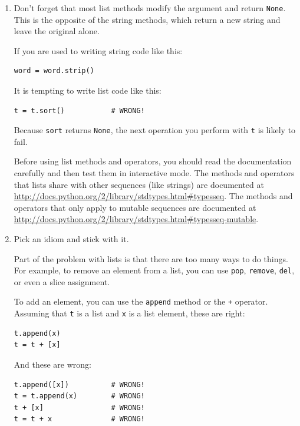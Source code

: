 \documentclass[10pt]{book}
\begin{document}
\begin{enumerate}

\item Don't forget that most list methods modify the argument and
  return {\tt None}.  This is the opposite of the string methods,
  which return a new string and leave the original alone.

If you are used to writing string code like this:

\begin{verbatim}
word = word.strip()
\end{verbatim}

It is tempting to write list code like this:

\begin{verbatim}
t = t.sort()           # WRONG!
\end{verbatim}

Because {\tt sort} returns {\tt None}, the
next operation you perform with {\tt t} is likely to fail.

Before using list methods and operators, you should read the
documentation carefully and then test them in interactive mode.  The
methods and operators that lists share with other sequences (like
strings) are documented at
\url{http://docs.python.org/2/library/stdtypes.html#typesseq}.  The
methods and operators that only apply to mutable sequences
are documented at \url{http://docs.python.org/2/library/stdtypes.html#typesseq-mutable}.


\item Pick an idiom and stick with it.

Part of the problem with lists is that there are too many
ways to do things.  For example, to remove an element from
a list, you can use {\tt pop}, {\tt remove}, {\tt del},
or even a slice assignment.

To add an element, you can use the {\tt append} method or
the {\tt +} operator.  Assuming that {\tt t} is a list and
{\tt x} is a list element, these are right:

\begin{verbatim}
t.append(x)
t = t + [x]
\end{verbatim}

And these are wrong:

\begin{verbatim}
t.append([x])          # WRONG!
t = t.append(x)        # WRONG!
t + [x]                # WRONG!
t = t + x              # WRONG!
\end{verbatim}


\end{enumerate}
\end{document}
